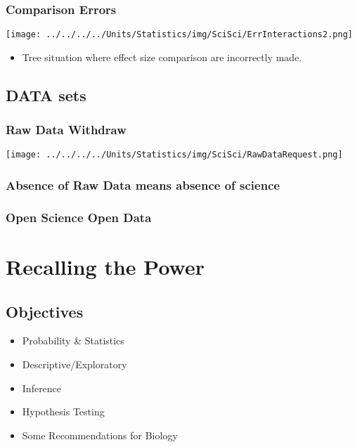 \documentclass[10pt,article]{article}
\begin{document}
\subsubsection{Comparison Errors}
\label{sec:orgc68811e}
\begin{center}
\texttt{[image: ../../../../Units/Statistics/img/SciSci/ErrInteractions2.png]}
\end{center}
\begin{itemize}
\item Tree situation where effect size comparison are incorrectly made.
\end{itemize}
\subsection{DATA sets}
\label{sec:orgea4766e}
\subsubsection{Raw Data Withdraw}
\label{sec:orge55d7b6}
\begin{center}
\texttt{[image: ../../../../Units/Statistics/img/SciSci/RawDataRequest.png]}
\end{center}
\subsubsection{Absence of Raw Data means absence of science}
\label{sec:org831e189}
\subsubsection{Open Science Open Data}
\label{sec:orgd2fd74d}
\section{Recalling the Power}
\label{sec:orge9ec17b}
\subsection{Objectives}
\label{sec:orgc734734}
\begin{itemize}
\item Probability \& Statistics
\item Descriptive/Exploratory
\item Inference
\item Hypothesis Testing
\item Some Recommendations for Biology
\end{itemize}
\end{document}

